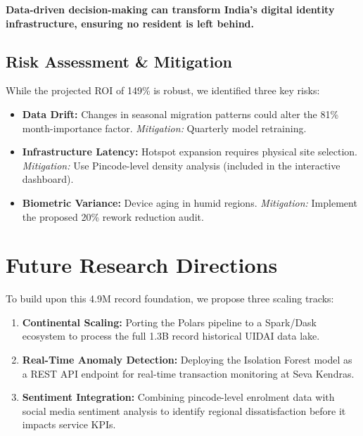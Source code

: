 \documentclass[12pt,a4paper]{article}
\begin{document}
\vspace{0.5cm}

\begin{center}
\colorbox{uidaiblue!20}{\parbox{0.9\textwidth}{
\centering
\vspace{0.3cm}
\textbf{\large Data-driven decision-making can transform India's digital identity infrastructure, ensuring no resident is left behind.}
\vspace{0.3cm}
}}
\end{center}

\subsection{Risk Assessment \& Mitigation}

While the projected ROI of 149\% is robust, we identified three key risks:
\begin{itemize}
    \item \textbf{Data Drift:} Changes in seasonal migration patterns could alter the 81\% month-importance factor. \textit{Mitigation:} Quarterly model retraining.
    \item \textbf{Infrastructure Latency:} Hotspot expansion requires physical site selection. \textit{Mitigation:} Use Pincode-level density analysis (included in the interactive dashboard).
    \item \textbf{Biometric Variance:} Device aging in humid regions. \textit{Mitigation:} Implement the proposed 20\% rework reduction audit.
\end{itemize}

\section{Future Research Directions}

To build upon this 4.9M record foundation, we propose three scaling tracks:
\begin{enumerate}
    \item \textbf{Continental Scaling:} Porting the Polars pipeline to a Spark/Dask ecosystem to process the full 1.3B record historical UIDAI data lake.
    \item \textbf{Real-Time Anomaly Detection:} Deploying the Isolation Forest model as a REST API endpoint for real-time transaction monitoring at Seva Kendras.
    \item \textbf{Sentiment Integration:} Combining pincode-level enrolment data with social media sentiment analysis to identify regional dissatisfaction before it impacts service KPIs.
\end{enumerate}
\end{document}
